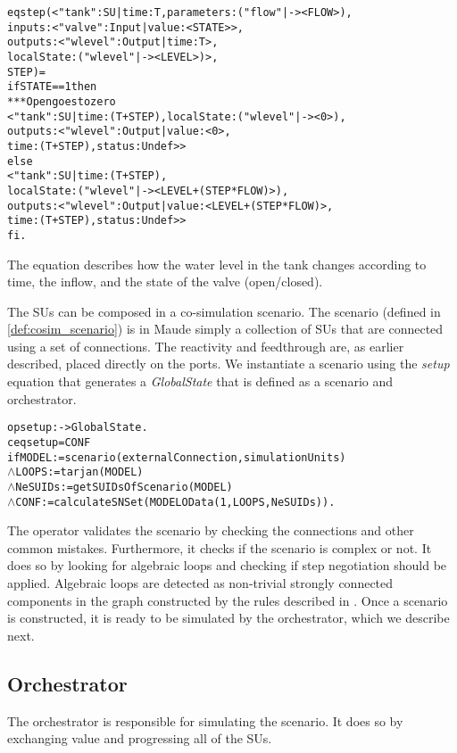 \begin{alltt}
  eq step(< "tank" : SU | time : T, parameters : ("flow" |-> < FLOW >), 
                      inputs : < "valve" : Input | value : < STATE > >, 
                      outputs : < "wlevel" : Output | time : T >,
                      localState : ( "wlevel" |-> < LEVEL > ) >,
                      STEP) = 
  if STATE == 1 then 
    *** Open goes to zero
      < "tank" : SU | time:(T+STEP), localState : ( "wlevel" |-> < 0 > ),
      outputs : < "wlevel" : Output | value : < 0 >, 
      time : (T + STEP), status : Undef > >
    else 
      < "tank" : SU | time : (T + STEP), 
      localState : ( "wlevel" |-> < LEVEL + (STEP * FLOW) > ), 
      outputs :< "wlevel" : Output|value : < LEVEL + (STEP * FLOW) >, 
      time : (T + STEP), status : Undef > > 
  fi .
\end{alltt}

The equation describes how the water level in the tank changes according to time, the inflow, and the state of the valve (open/closed).

The SUs can be composed in a co-simulation scenario.
The scenario (defined in \cref{def:cosim_scenario}) is in Maude simply a collection of SUs that are connected using a set of connections.
The reactivity and feedthrough are, as earlier described, placed directly on the ports.
We instantiate a scenario using the \emph{setup} equation that generates a \emph{GlobalState} that is defined as a scenario and orchestrator.
\begin{alltt}
  op setup : -> GlobalState .
  ceq setup = { CONF }
    if MODEL := scenario(externalConnection, simulationUnits)
    \(\land\) LOOPS := tarjan(MODEL)
    \(\land\) NeSUIDs := getSUIDsOfScenario(MODEL)
    \(\land\) CONF := calculateSNSet(MODEL OData(1,LOOPS, NeSUIDs)) .
\end{alltt}

The operator validates the scenario by checking the connections and other common mistakes.
Furthermore, it checks if the scenario is complex or not.
It does so by looking for algebraic loops and checking if step negotiation should be applied.
Algebraic loops are detected as non-trivial strongly connected components in the graph constructed by the rules described in . 
Once a scenario is constructed, it is ready to be simulated by the orchestrator, which we describe next. 

\subsection{Orchestrator}
The orchestrator is responsible for simulating the scenario.
It does so by exchanging value and progressing all of the SUs.

